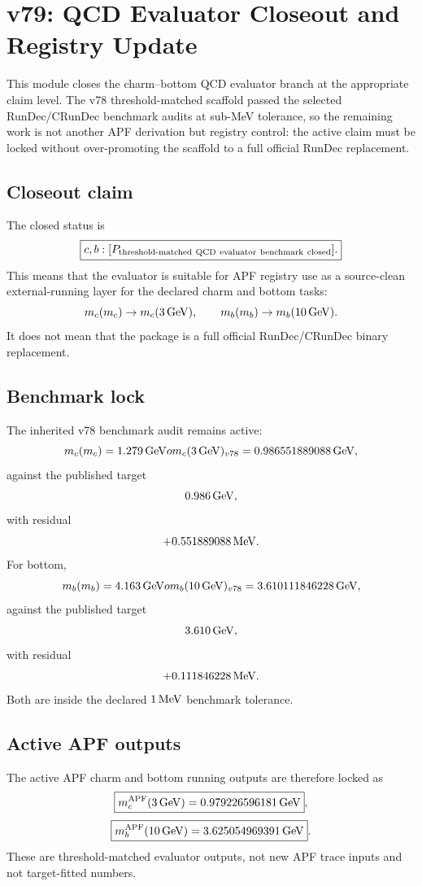 
\section{v79: QCD Evaluator Closeout and Registry Update}
\label{sec:v79-qcd-evaluator-closeout}

This module closes the charm--bottom QCD evaluator branch at the appropriate claim level.  The v78 threshold-matched scaffold passed the selected RunDec/CRunDec benchmark audits at sub-MeV tolerance, so the remaining work is not another APF derivation but registry control: the active claim must be locked without over-promoting the scaffold to a full official RunDec replacement.

\subsection{Closeout claim}
The closed status is
\[
  \boxed{c,b:[P_{\rm threshold\text{-}matched\ QCD\ evaluator\ benchmark\ closed}].}
\]
This means that the evaluator is suitable for APF registry use as a source-clean external-running layer for the declared charm and bottom tasks:
\[
  m_c(m_c)\to m_c(3\,{\rm GeV}),
  \qquad
  m_b(m_b)\to m_b(10\,{\rm GeV}).
\]
It does not mean that the package is a full official RunDec/CRunDec binary replacement.

\subsection{Benchmark lock}
The inherited v78 benchmark audit remains active:
\[
  m_c(m_c)=1.279\,{\rm GeV}	o m_c(3\,{\rm GeV})_{v78}=0.986551889088\,{\rm GeV},
\]
against the published target
\[
  0.986\,{\rm GeV},
\]
with residual
\[
  +0.551889088\,{\rm MeV}.
\]
For bottom,
\[
  m_b(m_b)=4.163\,{\rm GeV}	o m_b(10\,{\rm GeV})_{v78}=3.610111846228\,{\rm GeV},
\]
against the published target
\[
  3.610\,{\rm GeV},
\]
with residual
\[
  +0.111846228\,{\rm MeV}.
\]
Both are inside the declared $1\,{\rm MeV}$ benchmark tolerance.

\subsection{Active APF outputs}
The active APF charm and bottom running outputs are therefore locked as
\[
  \boxed{m_c^{\rm APF}(3\,{\rm GeV})=0.979226596181\,{\rm GeV}},
\]
\[
  \boxed{m_b^{\rm APF}(10\,{\rm GeV})=3.625054969391\,{\rm GeV}}.
\]
These are threshold-matched evaluator outputs, not new APF trace inputs and not target-fitted numbers.

